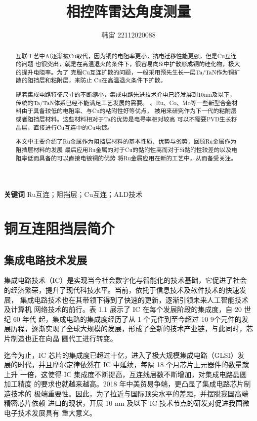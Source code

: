 \documentclass[UTF8,a4paper,12pt]{ctexart}%
\title{相控阵雷达角度测量}
\author{韩宙 22112020088}
\date{}
\begin{document}
\newpage
\begin{abstract}
	互联工艺中Al逐渐被Cu取代，因为铜的电阻率更小，抗电迁移性能更强，但是Cu互连的问题
	也很突出，就是在高温退火的条件下，很容易向Si中扩散形成铜的硅化物，极大的提升电阻率。为了
	克服Cu互连扩散的问题，一般采用预先生长一层Ta/TaN作为铜扩散的阻挡层和粘附层，来防止
	Cu在高温退火条件下扩散。


	随着集成电路特征尺寸的不断缩小，集成电路先进技术介电已经发展到10nm及以下，
	传统的Ta/TaN体系已经不能满足工艺发展的需要。
	。Ru、Co、Mo等一些新型合金材料由于具备较低的电阻率、与Cu的粘附性好等优点，
	被用来研究作为下一代的粘附层或者阻挡层材料。这些材料相对于Ta的优势是电导率相对较高
	可以不需要PVD生长籽晶层，直接进行Cu互连中的Cu电镀。


	本文中主要介绍了Ru金属作为阻挡层材料的基本性质、优势与劣势，回顾Ru金属作为阻挡层材料的发展
	最后应用Ru金属的对于Cu的黏附性高而对于Si黏附性较差的以及电阻率低而具备的可以直接电镀铜的优势
	将Ru金属应用在新的工艺中，从而备受关注。
\end{abstract}
\noindent{}\textbf{关键词}\quad{} Ru互连；阻挡层；Cu互连；ALD技术
\newpage
\tableofcontents %




\listoffigures%
\setcounter{page}{0}
\thispagestyle{empty}
\newpage

\section{铜互连阻挡层简介}
\subsection{集成电路技术发展}
集成电路技术（IC）是实现当今社会数字化与智能化的技术基础，它促进了社会
的经济繁荣，提升了现代科技水平。当前，依托于信息技术及软件技术的快速发展，
集成电路技术也在其带领下得到了快速的更新，逐渐引领未来人工智能技术及计算机
网络技术的前行。表 1.1 展示了 IC 在每个发展阶段的集成度，自 20 世纪 60 年代
起，集成电路的集成度经历了从 1 个元件到至今超过 10
9个元件的发展历程，逐渐实现了全球大规模的发展，形成了全新的技术产业链，与此同时，芯片制造也正在向晶
圆代工进行转变。


迄今为止，IC 芯片的集成度已超过十亿，进入了极大规模集成电路（GLSI）发
展的时代，并且摩尔定律依然在 IC 中延续，每隔 18 个月芯片上元器件的数量就上升
一倍，这使得 IC 集成度不断提高，互连线层数不断增加，对集成电路晶圆加工精度
的要求也就越来越高。2018 年中美贸易争端，更凸显了集成电路芯片制造技术的
极端重要性。因此，为了拉近与国际顶尖水平的差距，并摆脱我国高端精密芯片依赖
进口的现状，开展 10 nm 及以下 IC 技术节点的研发对促进我国微电子技术发展具有
重大意义。
\end{document}
